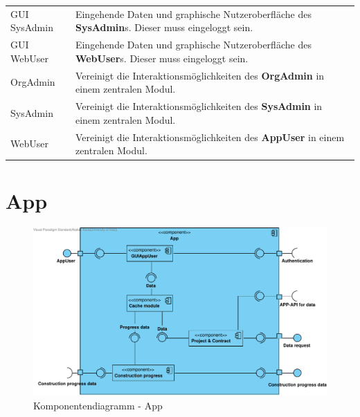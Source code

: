\begin{longtable}[h]{p{4cm} p{10.0cm}}
	\rowcolor[HTML]{E7E7E7} 
	GUI SysAdmin & Eingehende Daten und graphische Nutzeroberfläche des \textbf{SysAdmin}s. Dieser muss eingeloggt sein. \\
	
	GUI WebUser & Eingehende Daten und graphische Nutzeroberfläche des \textbf{WebUser}s. Dieser muss eingeloggt sein. \\
	
	\rowcolor[HTML]{E7E7E7} 
	OrgAdmin & Vereinigt die Interaktionsmöglichkeiten des \textbf{OrgAdmin} in einem zentralen Modul. \\
	
	SysAdmin & Vereinigt die Interaktionsmöglichkeiten des \textbf{SysAdmin} in einem zentralen Modul. \\
	
	\rowcolor[HTML]{E7E7E7} 
	WebUser & Vereinigt die Interaktionsmöglichkeiten des \textbf{AppUser} in einem zentralen Modul.
\end{longtable}

\clearpage

\section{App}

\begin{figure}[H]
	\centering
	\includegraphics[width=16cm]{img/diagrams/Component-App.pdf}
	\caption{Komponentendiagramm - App}
	\label{fig:komponentendiagramm-app}
\end{figure}


